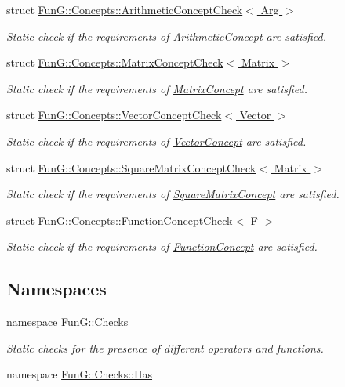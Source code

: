 \begin{DoxyCompactItemize}
struct \hyperlink{structFunG_1_1Concepts_1_1ArithmeticConceptCheck}{\-Fun\-G\-::\-Concepts\-::\-Arithmetic\-Concept\-Check$<$ Arg $>$}
\begin{DoxyCompactList}\small\item\em \-Static check if the requirements of \hyperlink{structFunG_1_1Concepts_1_1ArithmeticConcept}{\-Arithmetic\-Concept} are satisfied. \end{DoxyCompactList}\item 
struct \hyperlink{structFunG_1_1Concepts_1_1MatrixConceptCheck}{\-Fun\-G\-::\-Concepts\-::\-Matrix\-Concept\-Check$<$ Matrix $>$}
\begin{DoxyCompactList}\small\item\em \-Static check if the requirements of \hyperlink{structFunG_1_1Concepts_1_1MatrixConcept}{\-Matrix\-Concept} are satisfied. \end{DoxyCompactList}\item 
struct \hyperlink{structFunG_1_1Concepts_1_1VectorConceptCheck}{\-Fun\-G\-::\-Concepts\-::\-Vector\-Concept\-Check$<$ Vector $>$}
\begin{DoxyCompactList}\small\item\em \-Static check if the requirements of \hyperlink{structFunG_1_1Concepts_1_1VectorConcept}{\-Vector\-Concept} are satisfied. \end{DoxyCompactList}\item 
struct \hyperlink{structFunG_1_1Concepts_1_1SquareMatrixConceptCheck}{\-Fun\-G\-::\-Concepts\-::\-Square\-Matrix\-Concept\-Check$<$ Matrix $>$}
\begin{DoxyCompactList}\small\item\em \-Static check if the requirements of \hyperlink{structFunG_1_1Concepts_1_1SquareMatrixConcept}{\-Square\-Matrix\-Concept} are satisfied. \end{DoxyCompactList}\item 
struct \hyperlink{structFunG_1_1Concepts_1_1FunctionConceptCheck}{\-Fun\-G\-::\-Concepts\-::\-Function\-Concept\-Check$<$ F $>$}
\begin{DoxyCompactList}\small\item\em \-Static check if the requirements of \hyperlink{structFunG_1_1Concepts_1_1FunctionConcept}{\-Function\-Concept} are satisfied. \end{DoxyCompactList}\end{DoxyCompactItemize}
\subsection*{\-Namespaces}
\begin{DoxyCompactItemize}
\item 
namespace \hyperlink{namespaceFunG_1_1Checks}{\-Fun\-G\-::\-Checks}
\begin{DoxyCompactList}\small\item\em \-Static checks for the presence of different operators and functions. \end{DoxyCompactList}\item 
namespace \hyperlink{namespaceFunG_1_1Checks_1_1Has}{\-Fun\-G\-::\-Checks\-::\-Has}
\end{DoxyCompactItemize}
